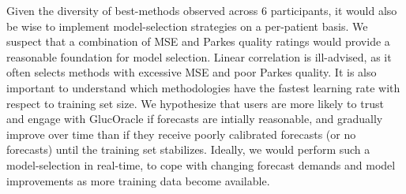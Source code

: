 \documentclass[10pt,letterpaper]{article}
\begin{document}
Given the diversity of best-methods observed across 6 participants, it would also be wise to implement model-selection strategies on a per-patient basis. We suspect that a combination of MSE and Parkes quality ratings would provide a reasonable foundation for model selection. Linear correlation is ill-advised, as it often selects methods with excessive MSE and poor Parkes quality. It is also important to understand which methodologies have the fastest learning rate with respect to training set size. We hypothesize that users are more likely to trust and engage with GlucOracle if forecasts are intially reasonable, and gradually improve over time than if they receive poorly calibrated forecasts (or no forecasts) until the training set stabilizes. Ideally, we would perform such a model-selection in real-time, to cope with changing forecast demands and model improvements as more training data become available. 
\end{document}
